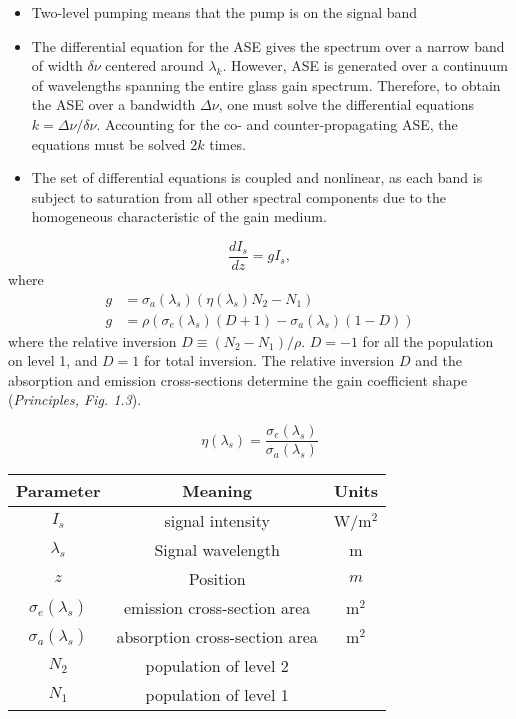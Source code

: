 \documentclass[a4paper]{article}
\begin{document}
\begin{itemize}
	\item Two-level pumping means that the pump is on the signal band
	\item The differential equation for the ASE gives the spectrum over a narrow band of width $\delta\nu$ centered around $\lambda_k$. However, ASE is generated over a continuum of wavelengths spanning the entire glass gain spectrum. Therefore, to obtain the ASE over a bandwidth $\Delta\nu$, one must solve the differential equations $k = \Delta\nu/\delta\nu$. Accounting for the co- and counter-propagating ASE, the equations must be solved $2k$ times.
	\item The set of differential equations is coupled and nonlinear, as each band is subject to saturation from all other spectral components due to the homogeneous characteristic of the gain medium. 
	
\end{itemize}

\begin{equation}
	\dfrac{dI_s}{dz} = gI_s,
\end{equation}
where 
\begin{align}
g &= \sigma_a(\lambda_s)(\eta(\lambda_s)N_2 - N_1) \tag{signal gain coefficient}\\
g &= \rho(\sigma_e(\lambda_s)(D+1) -  \sigma_a(\lambda_s)(1-D))\tag{signal gain coefficient as a function of the relative inversion}
\end{align}
where the relative inversion $D \equiv (N_2 - N_1)/\rho$. $D = -1$ for all the population on level 1, and $D = 1$ for total inversion. The relative inversion $D$ and the absorption and emission cross-sections determine the gain coefficient shape (\textit{Principles, Fig. 1.3}).

\begin{equation}
	\eta(\lambda_s) = \frac{\sigma_e(\lambda_s)}{\sigma_a(\lambda_s)} \tag{cross-secion ratio}
\end{equation}

\begin{center}
	\begin{tabular}{c|c|c}
	Parameter & Meaning & Units \\
	\hline
	$I_s$ & signal intensity & W/m$^2$ \\
	$\lambda_s$ & Signal wavelength & m \\
	$z$ & Position & $m$ \\
	$\sigma_e(\lambda_s)$ & emission cross-section area & m$^2$ \\
	$\sigma_a(\lambda_s)$ & absorption cross-section area & m$^2$ \\
	$N_2$ & population of level 2 & \\
	$N_1$ & population of level 1 & \\
	\hline
\end{tabular}
\end{center}
\end{document}
